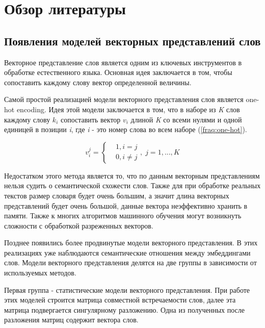 \documentclass[a4paper,14pt]{article}
\begin{document}
\newpage


\section{Обзор литературы}

\subsection{Появления моделей векторных представлений слов}

Векторное представление слов является одним из ключевых инструментов в обработке естественного языка.
Основная идея заключается в том, чтобы сопоставить каждому слову вектор определенной величины.

Самой простой реализацией модели векторного представления слов является one-hot encoding.
Идея этой модели заключается в том, что в наборе из \textit{K} слов каждому слову $k_i$ сопоставить вектор $v_i$ длиной \textit{K} со всеми нулями и одной единицей в позиции \textit{i}, где \textit{i} - это номер слова во всем наборе (\ref{fraq:one-hot}).

\begin{equation}
	v_i^j = \left\{
	\begin{matrix}
		& 1, i = j\\
		& 0, i \neq j
	\end{matrix}
	\right.
	,\;j = 1, ..., K	
	\label{fraq:one-hot}
\end{equation}

Недостатком этого метода является то, что по данным векторным представлениям нельзя судить о семантической схожести слов.
Также для при обработке реальных текстов размер словаря будет очень большим, а значит длина векторных представлений будет очень большой, данные вектора неэффективно хранить в памяти.
Также к многих алгоритмов машинного обучения могут возникнуть сложности с обработкой разреженных векторов.

Позднее появились более продвинутые модели векторного представления.
В этих реализациях уже наблюдаются семантические отношения между эмбеддингами слов.
Модели векторного представления делятся на две группы в зависимости от используемых методов.

Первая группа - статистические модели векторного представления.
При работе этих моделей строится матрица совместной встречаемости слов, далее эта матрица подвергается сингулярному разложению.
Одна из полученных после разложения матриц содержит вектора слов.
\end{document}
